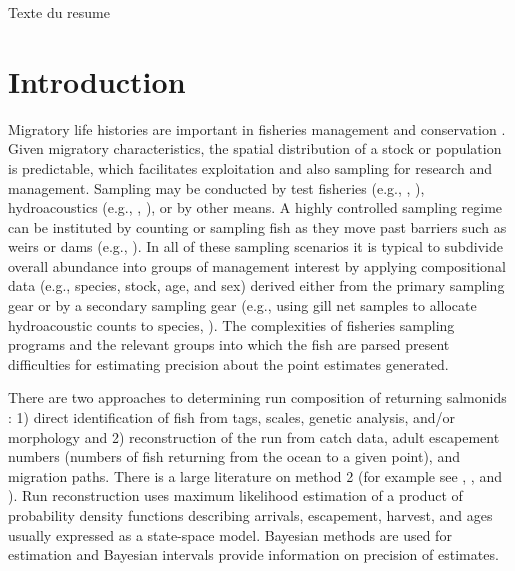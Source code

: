 \documentclass[%
                leqno,         %
%
]{nrc1}                          %
\begin{document}
\begin{resume}
   Texte du resume
\end{resume}

\newpage




\section*{Introduction}

Migratory life histories are important in fisheries management and conservation  \citep{Hilborn1992,McDowall2009}. Given migratory characteristics, the spatial distribution of a stock or population is predictable, which facilitates exploitation and also sampling for research and management. Sampling may be conducted by test fisheries (e.g., \citet{Flynn2004}, \citet{Beacham2012}), hydroacoustics (e.g., \citet{Tarbox1996}, \citet{Pritt2013}), or by other means. A highly controlled sampling regime can be instituted by counting or sampling fish as they move past barriers such as weirs or dams (e.g., \citet{Wagner2007}). In all of these sampling scenarios it is typical to subdivide overall abundance into groups of management interest by applying compositional data (e.g., species, stock, age, and sex) derived either from the primary sampling gear or by a secondary sampling gear (e.g., using gill net samples to allocate hydroacoustic counts to species, \citet{Rudstam2012}). The complexities of fisheries sampling programs and the relevant groups into which the fish are parsed present difficulties for estimating precision about the point estimates generated.

There are two approaches to determining run composition of returning salmonids \citep{Starr1988}: 1) direct identification of fish from tags, scales, genetic analysis, and/or morphology and 2) reconstruction of the run from catch data, adult escapement numbers (numbers of fish returning from the ocean to a given point), and migration paths.  There is a large literature on method 2 (for example see \citet{Buckland2007}, \citet{Newman2009}, and \citet{Branch2010}).  Run reconstruction uses maximum likelihood estimation of a product of probability density functions describing arrivals, escapement, harvest, and ages usually expressed as a state-space model. Bayesian methods are used for estimation and Bayesian intervals provide information on precision of estimates.
\end{document}
